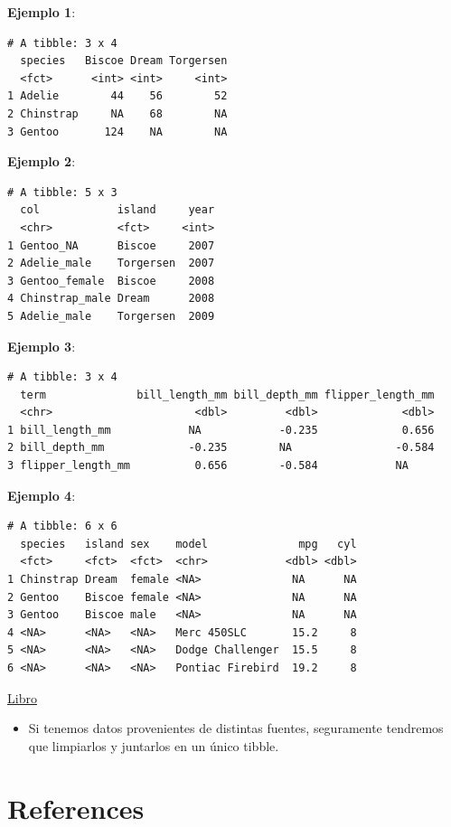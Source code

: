 \documentclass[
  letterpaper,
  DIV=11,
  numbers=noendperiod]{scrreprt}
\providecommand{\tightlist}{%
  \setlength{\itemsep}{0pt}\setlength{\parskip}{0pt}}\usepackage{longtable,booktabs,array}
\newlength{\cslhangindent}
\newlength{\cslentryspacingunit} %
\newenvironment{CSLReferences}[2] %
 {%
  \setlength{\parindent}{0pt}
  \ifodd #1
  \let\oldpar\par
  \def\par{\hangindent=\cslhangindent\oldpar}
  \fi
  \setlength{\parskip}{#2\cslentryspacingunit}
 }%
 {}
\begin{document}
\textbf{Ejemplo 1}:

\begin{verbatim}
# A tibble: 3 x 4
  species   Biscoe Dream Torgersen
  <fct>      <int> <int>     <int>
1 Adelie        44    56        52
2 Chinstrap     NA    68        NA
3 Gentoo       124    NA        NA
\end{verbatim}

\textbf{Ejemplo 2}:

\begin{verbatim}
# A tibble: 5 x 3
  col            island     year
  <chr>          <fct>     <int>
1 Gentoo_NA      Biscoe     2007
2 Adelie_male    Torgersen  2007
3 Gentoo_female  Biscoe     2008
4 Chinstrap_male Dream      2008
5 Adelie_male    Torgersen  2009
\end{verbatim}

\textbf{Ejemplo 3}:

\begin{verbatim}
# A tibble: 3 x 4
  term              bill_length_mm bill_depth_mm flipper_length_mm
  <chr>                      <dbl>         <dbl>             <dbl>
1 bill_length_mm            NA            -0.235             0.656
2 bill_depth_mm             -0.235        NA                -0.584
3 flipper_length_mm          0.656        -0.584            NA    
\end{verbatim}

\textbf{Ejemplo 4}:

\begin{verbatim}
# A tibble: 6 x 6
  species   island sex    model              mpg   cyl
  <fct>     <fct>  <fct>  <chr>            <dbl> <dbl>
1 Chinstrap Dream  female <NA>              NA      NA
2 Gentoo    Biscoe female <NA>              NA      NA
3 Gentoo    Biscoe male   <NA>              NA      NA
4 <NA>      <NA>   <NA>   Merc 450SLC       15.2     8
5 <NA>      <NA>   <NA>   Dodge Challenger  15.5     8
6 <NA>      <NA>   <NA>   Pontiac Firebird  19.2     8
\end{verbatim}

\href{https://bookdown.org/rodolfo_carvajal/apunte/02-tablas-de-datos}{Libro}

\begin{itemize}
\tightlist
\item
  Si tenemos datos provenientes de distintas fuentes, seguramente
  tendremos que limpiarlos y juntarlos en un único tibble.
\end{itemize}


\hypertarget{references}{%
\chapter*{References}\label{references}}


\hypertarget{refs}{}
\begin{CSLReferences}{0}{0}
\end{CSLReferences}
\end{document}
